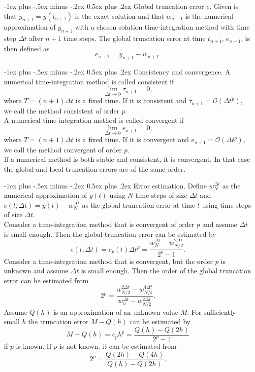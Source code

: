 \documentclass[10pt,landscape,a4paper]{article}
\makeatletter
\renewcommand{\section}{\@startsection{section}{1}{0mm}%
	{-1ex plus -.5ex minus -.2ex}%
	{0.5ex plus .2ex}%
	{\normalfont\large\bfseries}}
\makeatother
\begin{document}
\begin{multicols}{3}
		\section{Global truncation error $ e $.}
		Given is that $ y_{n+1}=y(t_{n+1}) $ is the exact solution and that $ w_{n+1} $ is the numerical approximation of $ y_{n+1} $ with a chosen solution time-integration method with time step $ \Delta t $ after $ n+1 $ time steps. The global truncation error at time $ t_{n+1} $, $ e_{n+1} $, is then defined as
		\[
			e_{n+1}=y_{n+1}-w_{n+1}.
		\]
		
		\section{Consistency and convergence.}
		A numerical time-integration method is called consistent if
		\[
			\lim_{\Delta t\rightarrow0}\tau_{n+1}=0,
		\]
		where $ T=(n+1)\Delta t $ is a fixed time. If it is consistent and $ \tau_{n+1}=\mathcal{O}(\Delta t^p) $, we call the method consistent of order $ p $.\\
		A numerical time-integration method is called convergent if
		\[
			\lim_{\Delta t\rightarrow0}e_{n+1}=0,
		\]
		where $ T=(n+1)\Delta t $ is a fixed time. If it is convergent and $ e_{n+1}=\mathcal{O}(\Delta t^p) $, we call the method convergent of order $ p $.\\
		If a numerical method is both stable and consistent, it is convergent. In that case the global and local truncation errors are of the same order.
		
		\section{Error estimation.}
		Define $ w_N^{\Delta t} $ as the numerical approximation of $ y(t) $ using $ N $ time steps of size $ \Delta t $ and $ e(t,\Delta t)=y(t)-w_N^{\Delta t} $ as the global truncation error at time $ t $ using time steps of size $ \Delta t $.\\
		Consider a time-integration method that is convergent of order $ p $ and assume $ \Delta t $ is small enough.
		Then the global truncation error can be estimated by
		\[
		e(t,\Delta t)=c_p(t)\Delta t^p=\frac{w_N^{\Delta t}-w_{N/2}^{2\Delta t}}{2^p-1}.
		\]
		Consider a time-integration method that is convergent, but the order $ p $ is unknown and assume $ \Delta t $ is small enough.
		Then the order of the global truncation error can be estimated from
		\[
		2^p=\frac{w_{N/2}^{2\Delta t}-w_{N/4}^{4\Delta t}}{w_n^{\Delta t}-w_{N/2}^{2\Delta t}}.
		\]
		Assume $ Q(h) $ is an approximation of an unknown value $ M $.
		For sufficiently small $ h $ the truncation error $ M-Q(h) $ can be estimated by
		\[
			M-Q(h)=c_ph^p=\frac{Q(h)-Q(2h)}{2^p-1}
		\]
		if $ p $ is known. If $ p $ is not known, it can be estimated from
		\[
			2^p=\frac{Q(2h)-Q(4h)}{Q(h)-Q(2h)}.
		\]
		

\end{multicols}
\end{document}
